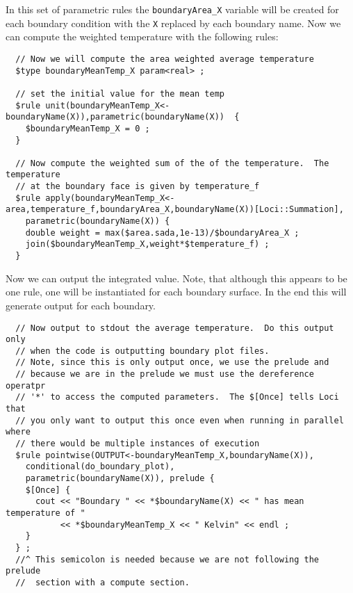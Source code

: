 \documentclass[letterpaper,twoside]{article}
\begin{document}
In this set of parametric rules the {\tt boundaryArea\_X} variable will be
created for each boundary condition with the {\tt X} replaced by each
boundary name.  Now we can compute the weighted temperature with the
following rules:
\begin{verbatim}
  // Now we will compute the area weighted average temperature
  $type boundaryMeanTemp_X param<real> ;

  // set the initial value for the mean temp
  $rule unit(boundaryMeanTemp_X<-boundaryName(X)),parametric(boundaryName(X))  {
    $boundaryMeanTemp_X = 0 ;
  }
  
  // Now compute the weighted sum of the of the temperature.  The temperature
  // at the boundary face is given by temperature_f
  $rule apply(boundaryMeanTemp_X<-area,temperature_f,boundaryArea_X,boundaryName(X))[Loci::Summation],
    parametric(boundaryName(X)) {
    double weight = max($area.sada,1e-13)/$boundaryArea_X ;
    join($boundaryMeanTemp_X,weight*$temperature_f) ;
  }
\end{verbatim}

Now we can output the integrated value.  Note, that although this
appears to be one rule, one will be instantiated for each boundary
surface.  In the end this will generate output for each boundary.
\begin{verbatim}
  // Now output to stdout the average temperature.  Do this output only
  // when the code is outputting boundary plot files.
  // Note, since this is only output once, we use the prelude and
  // because we are in the prelude we must use the dereference operatpr
  // '*' to access the computed parameters.  The $[Once] tells Loci that
  // you only want to output this once even when running in parallel where
  // there would be multiple instances of execution
  $rule pointwise(OUTPUT<-boundaryMeanTemp_X,boundaryName(X)),
    conditional(do_boundary_plot),
    parametric(boundaryName(X)), prelude {
    $[Once] {
      cout << "Boundary " << *$boundaryName(X) << " has mean temperature of " 
           << *$boundaryMeanTemp_X << " Kelvin" << endl ;
    }
  } ;
  //^ This semicolon is needed because we are not following the prelude
  //  section with a compute section.
\end{verbatim}
\clearpage
\end{document}
